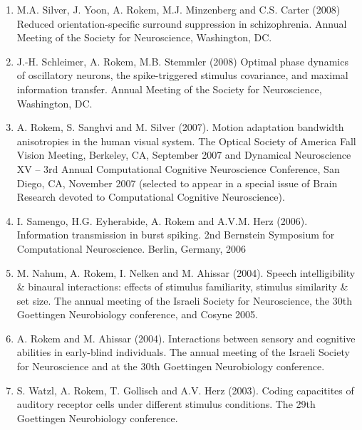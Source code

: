 \documentclass[11pt,fullpage]{article}
\begin{document}
\begin{enumerate}
\item M.A. Silver, J. Yoon, A. Rokem, M.J. Minzenberg and C.S. Carter (2008) Reduced orientation-specific surround suppression in schizophrenia. Annual Meeting of the Society for Neuroscience, Washington, DC.

\item J.-H. Schleimer, A. Rokem, M.B. Stemmler (2008) Optimal phase dynamics of oscillatory neurons, the spike-triggered stimulus covariance, and maximal information transfer. Annual Meeting of the Society for Neuroscience, Washington, DC.

\item A. Rokem, S. Sanghvi and M. Silver (2007). Motion adaptation bandwidth anisotropies in the human visual system. The Optical Society of America Fall Vision Meeting, Berkeley, CA, September 2007 and Dynamical Neuroscience XV – 3rd Annual Computational Cognitive Neuroscience Conference, San Diego, CA, November 2007 (selected to appear in a special issue of Brain Research devoted to Computational Cognitive Neuroscience).

\item I. Samengo, H.G. Eyherabide, A. Rokem and A.V.M. Herz (2006). Information transmission in burst spiking. 2nd Bernstein Symposium for Computational Neuroscience. Berlin, Germany, 2006

\item M. Nahum, A. Rokem, I. Nelken and M. Ahissar (2004). Speech intelligibility \& binaural interactions: effects of stimulus familiarity, stimulus similarity \& set size. The annual meeting of the Israeli Society for Neuroscience, the 30th Goettingen Neurobiology conference, and Cosyne 2005.

\item A. Rokem and M. Ahissar (2004). Interactions between sensory and cognitive abilities in early-blind individuals. The annual meeting of the Israeli Society for Neuroscience and at the 30th Goettingen Neurobiology conference.

\item S. Watzl, A. Rokem, T. Gollisch and A.V. Herz (2003). Coding capacitites of auditory receptor cells under different stimulus conditions. The 29th Goettingen Neurobiology conference.
\end{enumerate}
\end{document}
